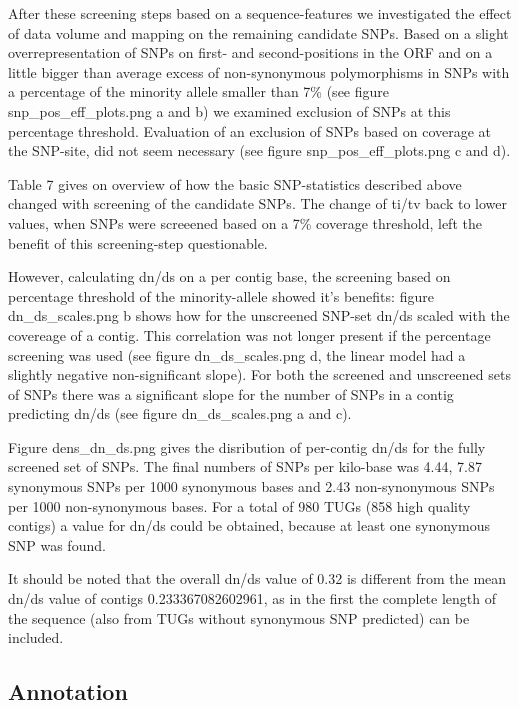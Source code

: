 \documentclass[10pt]{bmc_article}
\newenvironment{bmcformat}{\begin{raggedright}\baselineskip20pt\sloppy\setboolean{publ}{false}}{\end{raggedright}\baselineskip20pt\sloppy}
\begin{document}
\begin{bmcformat}
After these screening steps based on a sequence-features we
investigated the effect of data volume and mapping on the remaining
candidate SNPs. Based on a slight overrepresentation of SNPs on first-
and second-positions in the ORF and on a little bigger than average
excess of non-synonymous polymorphisms in SNPs with a percentage of
the minority allele smaller than 7\% (see figure
snp\_pos\_eff\_plots.png a and b) we examined exclusion of SNPs at
this percentage threshold. Evaluation of an exclusion of SNPs based on
coverage at the SNP-site, did not seem necessary (see figure
snp\_pos\_eff\_plots.png c and d).

Table 7 gives on overview of how the basic SNP-statistics described
above changed with screening of the candidate SNPs. The change of
ti/tv back to lower values, when SNPs were screeened based on a 7\%
coverage threshold, left the benefit of this screening-step
questionable.

However, calculating dn/ds on a per contig base, the screening based
on percentage threshold of the minority-allele showed it's benefits:
figure dn\_ds\_scales.png b shows how for the unscreened SNP-set dn/ds
scaled with the covereage of a contig. This correlation was not longer
present if the percentage screening was used (see figure
dn\_ds\_scales.png d, the linear model had a slightly negative
non-significant slope). For both the screened and unscreened sets of
SNPs there was a significant slope for the number of SNPs in a contig
predicting dn/ds (see figure dn\_ds\_scales.png a and c).

Figure dens\_dn\_ds.png gives the disribution of per-contig dn/ds for
the fully screened set of SNPs. The final numbers of SNPs per
kilo-base was 4.44,
7.87 synonymous SNPs per 1000 synonymous
bases and 2.43 non-synonymous SNPs per
1000 non-synonymous bases. For a total of
980 TUGs
(858 high
  quality contigs) a value for dn/ds could be obtained, because at
  least one synonymous SNP was found.

  It should be noted that the overall dn/ds value of
  0.32 is different from the mean dn/ds value of contigs
  0.233367082602961, as in the first the
  complete length of the sequence (also from TUGs without synonymous
  SNP predicted) can be included.

\subsection*{Annotation}



\end{bmcformat}
\end{document}

